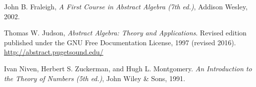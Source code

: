 \documentclass[openany, oneside]{book}
\begin{document}
\begin{thebibliography}{99}

 John B. Fraleigh, \textit{A First Course in Abstract Algebra (7th ed.)}, Addison Wesley, 2002.

 Thomas W. Judson, \textit{Abstract Algebra: Theory and Applications}. Revised edition published under the GNU Free
Documentation License, 1997 (revised 2016). \url{
http://abstract.pugetsound.edu/}

 Ivan Niven, Herbert S. Zuckerman, and Hugh L.
Montgomery. \textit{An Introduction to the Theory of Numbers (5th
ed.)}, John Wiley \& Sons, 1991.

\end{thebibliography}
\end{document}
